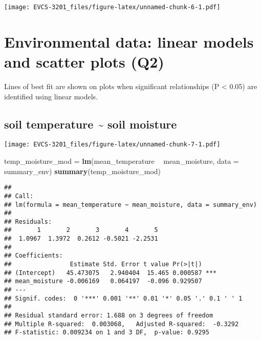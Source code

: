\documentclass[]{book}
\newenvironment{Shaded}{\begin{snugshade}}{\end{snugshade}}
\newcommand{\KeywordTok}[1]{\textcolor[rgb]{0.13,0.29,0.53}{\textbf{#1}}}
\newcommand{\DataTypeTok}[1]{\textcolor[rgb]{0.13,0.29,0.53}{#1}}
\newcommand{\StringTok}[1]{\textcolor[rgb]{0.31,0.60,0.02}{#1}}
\newcommand{\OperatorTok}[1]{\textcolor[rgb]{0.81,0.36,0.00}{\textbf{#1}}}
\newcommand{\NormalTok}[1]{#1}
\begin{document}
\texttt{[image: EVCS-3201\_files/figure-latex/unnamed-chunk-6-1.pdf]}

\section{Environmental data: linear models and scatter plots
(Q2)}\label{environmental-data-linear-models-and-scatter-plots-q2}

Lines of best fit are shown on plots when significant relationships (P
\textless{} 0.05) are identified using linear models.

\subsection*{soil temperature \textasciitilde{} soil
moisture}\label{soil-temperature-soil-moisture}

\begin{Shaded}
\end{Shaded}

\texttt{[image: EVCS-3201\_files/figure-latex/unnamed-chunk-7-1.pdf]}

\begin{Shaded}
\begin{Highlighting}[]
\NormalTok{temp_moisture_mod =}\StringTok{ }\KeywordTok{lm}\NormalTok{(mean_temperature }\OperatorTok{~}\StringTok{ }\NormalTok{mean_moisture, }\DataTypeTok{data =}\NormalTok{ summary_env)}
\KeywordTok{summary}\NormalTok{(temp_moisture_mod)}
\end{Highlighting}
\end{Shaded}

\begin{verbatim}
## 
## Call:
## lm(formula = mean_temperature ~ mean_moisture, data = summary_env)
## 
## Residuals:
##       1       2       3       4       5 
##  1.0967  1.3972  0.2612 -0.5021 -2.2531 
## 
## Coefficients:
##                Estimate Std. Error t value Pr(>|t|)    
## (Intercept)   45.473075   2.940404  15.465 0.000587 ***
## mean_moisture -0.006169   0.064197  -0.096 0.929507    
## ---
## Signif. codes:  0 '***' 0.001 '**' 0.01 '*' 0.05 '.' 0.1 ' ' 1
## 
## Residual standard error: 1.688 on 3 degrees of freedom
## Multiple R-squared:  0.003068,   Adjusted R-squared:  -0.3292 
## F-statistic: 0.009234 on 1 and 3 DF,  p-value: 0.9295
\end{verbatim}
\end{document}
